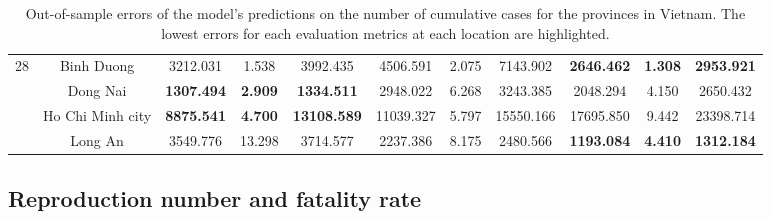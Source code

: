 \begin{landscape}
\begin{table}[!htb]
\begin{tabular}{| c | c | c | c | c | c | c | c | c | c | c |}
        \multirow{4}{*}{28}
            & Binh Duong & 3212.031 & 1.538 & 3992.435 & 4506.591 & 2.075 & 7143.902 & \textbf{2646.462} & \textbf{1.308} & \textbf{2953.921} \\
            & Dong Nai & \textbf{1307.494} & \textbf{2.909} & \textbf{1334.511} & 2948.022 & 6.268 & 3243.385 & 2048.294 & 4.150 & 2650.432 \\
            & Ho Chi Minh city & \textbf{8875.541} & \textbf{4.700} & \textbf{13108.589} & 11039.327 & 5.797 & 15550.166 & 17695.850 & 9.442 & 23398.714 \\
            & Long An & 3549.776 & 13.298 & 3714.577 & 2237.386 & 8.175 & 2480.566 & \textbf{1193.084} & \textbf{4.410} & \textbf{1312.184} \\ \hline
    \end{tabular}
    \caption{Out-of-sample errors of the model's predictions on the number of cumulative cases for the provinces in Vietnam. The lowest errors for each evaluation metrics at each location are highlighted.}
\end{table}
\end{landscape}

\subsection{Reproduction number and fatality rate}

